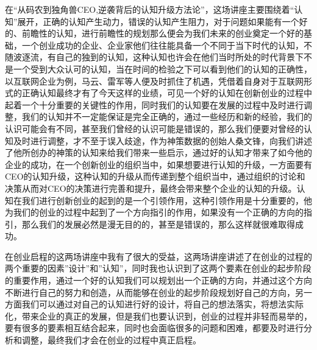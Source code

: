 \documentclass{article}
\begin{document}
在“从码农到独角兽CEO,逆袭背后的认知升级方法论”，这场讲座主要围绕着“认知”展开，正确的认知产生动力，错误的认知产生阻力，对于问题如果能有一个好的、前瞻性的认知，进行前瞻性的规划那么便会为我们未来的创业奠定一个好的基础，一个创业成功的企业、企业家他们往往能具备一个不同于当下时代的认知，不随波逐流，有自己的独到的认知，这种认知也许会在他们当时所处的时代背景下不是一个受到大众认可的认知，当在时间的检验之下可以看到他们的认知的正确性，以互联网企业为例，马云、雷军等人便及时抓住了机遇，凭借着自身对于互联网形式的正确认知最终才有了今天这样的业绩，可见一个好的认知在创新创业的过程中起着一个十分重要的关键性的作用，同时我们的认知要在发展的过程中及时进行调整，我们的认知并不一定能保证是完全正确的，通过一些经历和新的经验，我们的认识可能会有不同，甚至我们曾经的认识可能是错误的，那么我们便要对曾经的认知及时进行调整，才不至于误入歧途，作为神策数据的创始人桑文锋，向我们讲述了他所创办的神策的认知来给我们带来一些启示，通过好的认知才带来了如今他的企业的成功，在一个创新创业的组织当中，如果想要进行认知的升级，一方面要有CEO的认知升级，这种认知的升级从而传递到整个组织当中，通过组织的讨论和决策从而对CEO的决策进行完善和提升，最终会带来整个企业的认知的升级。认知在我们进行创新创业的起到的是一个引领作用，这种引领作用是十分重要的，他为我们的创业的过程中起到了一个方向指引的作用，如果没有一个正确的方向的指引，那么我们的发展必然是漫无目的的，甚至是错误的，那么这样就很难取得成功。

在创业启程的这两场讲座中我有了很大的受益，这两场讲座讲述了在创业的过程的两个重要的因素”设计”和”认知”，同时我也认识到了这两个要素在创业的起步阶段的重要作用，通过一个好的认知我们可以规划出一个正确的方向，并通过这个方向不断进行自己的努力和创造，从而能够在创业的起步阶段规划好自己的方向，另一方面我们可以通过对自己的认知进行好的设计，将自己的想法落实，将想法实际化，带来企业的真正的发展，但是我们也要认识到，创业的过程并非轻而易举的，要有很多的要素相互结合起来，同时也会面临很多的问题和困难，都要及时进行分析和调整，最终我们才会在创业的过程中真正启程。
\end{document}
